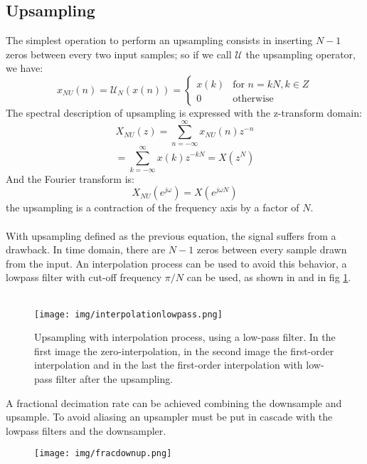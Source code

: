 \subsection{Upsampling}
The simplest operation to perform an upsampling consists in inserting $N-1$ zeros between every two input samples; so if we call $\mathcal{U}$ the upsampling operator, we have:
\[ x_{NU}(n) = \mathcal{U}_N(x(n)) = \begin{cases} x(k) &\mbox{for }  n=kN, k \in Z \\ 
0 & \mbox{otherwise } \end{cases} \]
The spectral description of upsampling is expressed with the z-transform domain:
\[ X_{NU}(z) = \sum_{n=-\infty}^\infty x_{NU}(n)z^{-n} \]
\[ = \sum_{k=-\infty}^\infty x(k)z^{-kN} = X(z^N)\]
And the Fourier transform is:
\[ X_{NU}(e^{j\omega}) = X(e^{j\omega N}) \]
the upsampling is a contraction of the frequency axis by a factor of $N$.\\\\
With upsampling defined as the previous equation, the signal suffers from a drawback. In time domain, there are $N-1$ zeros between every sample drawn from the input. An interpolation process can be used to avoid this behavior, a lowpass filter with cut-off frequency $\pi/N$ can be used, as shown in \cite{signalcommunications} and in fig \ref{fig:interpolationlowpass}. \\\\ 
\begin{figure}[h]\centering
\texttt{[image: img/interpolationlowpass.png]} 
\caption{Upsampling with interpolation process, using a low-pass filter. In the first image the zero-interpolation, in the second image the first-order interpolation and in the last the first-order interpolation with low-pass filter after the upsampling.} \label{fig:interpolationlowpass}
\end{figure}
A fractional decimation rate can be achieved combining the downsample and upsample. To avoid aliasing an upsampler must be put in cascade with the lowpass filters and the downsampler.
\begin{figure}[H]\centering
\texttt{[image: img/fracdownup.png]} 
\end{figure}

